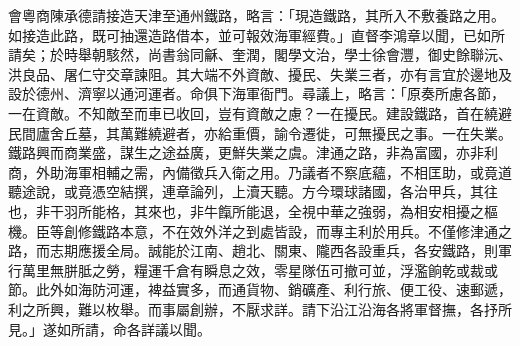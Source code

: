 \begin{pinyinscope}
會粵商陳承德請接造天津至通州鐵路，略言：「現造鐵路，其所入不敷養路之用。如接造此路，既可抽還造路借本，並可報效海軍經費。」直督李鴻章以聞，已如所請矣；於時舉朝駭然，尚書翁同龢、奎潤，閣學文治，學士徐會灃，御史餘聯沅、洪良品、屠仁守交章諫阻。其大端不外資敵、擾民、失業三者，亦有言宜於邊地及設於德州、濟寧以通河運者。命俱下海軍衙門。尋議上，略言：「原奏所慮各節，一在資敵。不知敵至而車已收回，豈有資敵之慮？一在擾民。建設鐵路，首在繞避民間廬舍丘墓，其萬難繞避者，亦給重價，諭令遷徙，可無擾民之事。一在失業。鐵路興而商業盛，謀生之途益廣，更鮮失業之虞。津通之路，非為富國，亦非利商，外助海軍相輔之需，內備徵兵入衛之用。乃議者不察底蘊，不相匡助，或竟道聽途說，或竟憑空結撰，連章論列，上瀆天聽。方今環球諸國，各治甲兵，其往也，非干羽所能格，其來也，非牛餼所能退，全視中華之強弱，為相安相擾之樞機。臣等創修鐵路本意，不在效外洋之到處皆設，而專主利於用兵。不僅修津通之路，而志期應援全局。誠能於江南、趙北、關東、隴西各設重兵，各安鐵路，則軍行萬里無胼胝之勞，糧運千倉有瞬息之效，零星隊伍可撤可並，浮濫餉乾或裁或節。此外如海防河運，裨益實多，而通貨物、銷礦產、利行旅、便工役、速郵遞，利之所興，難以枚舉。而事屬創辦，不厭求詳。請下沿江沿海各將軍督撫，各抒所見。」遂如所請，命各詳議以聞。


\end{pinyinscope}
